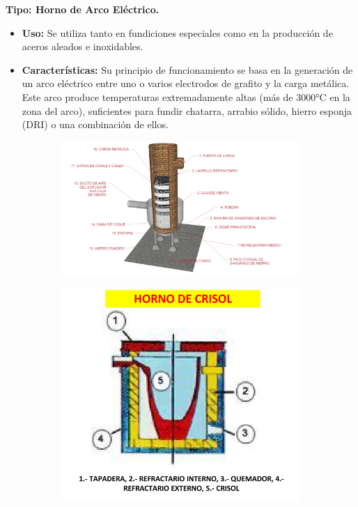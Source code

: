 \documentclass[12pt,a4paper]{article}
\begin{document}
\textbf{Tipo: Horno de Arco Eléctrico.}

\begin{itemize}
    \item \textbf{Uso:} Se utiliza tanto en fundiciones especiales como en la producción de aceros aleados e inoxidables.
    \item \textbf{Características:} Su principio de funcionamiento se basa en la generación de un arco eléctrico entre uno o varios electrodos de grafito y la carga metálica. Este arco produce temperaturas extremadamente altas (más de 3000°C en la zona del arco), suficientes para fundir chatarra, arrabio sólido, hierro esponja (DRI) o una combinación de ellos.
\end{itemize}

\begin{figure}[h!]
    \centering
    \begin{subfigure}{0.9\textwidth}
        \centering
        \includegraphics[width=\textwidth]{Inagenes para latex/cubilote.png}
        \label{cubilote}
    \end{subfigure}
    \begin{subfigure}{0.45\textwidth}
        \centering
        \includegraphics[width=\textwidth]{Inagenes para latex/crisol.png}

\end{subfigure}
\end{figure}
\end{document}
